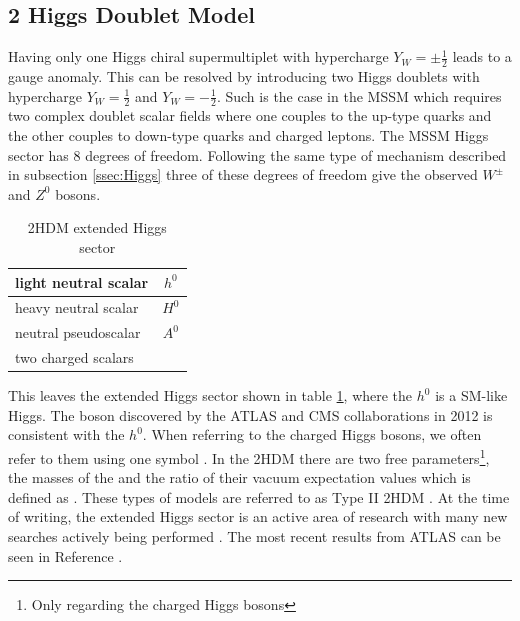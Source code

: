 	\subsection{2 Higgs Doublet Model}\label{ssec:2HDM}
		Having only one Higgs chiral supermultiplet with hypercharge $Y_W=\pm \frac{1}{2}$ leads to a gauge anomaly. This can be resolved by introducing two Higgs doublets with hypercharge $Y_W=\frac{1}{2}$ and $Y_W=-\frac{1}{2}$. Such is the case in the \gls{MSSM} which requires two complex doublet scalar fields where one couples to the up-type quarks and the other couples to down-type quarks and charged leptons. The \gls{MSSM} Higgs sector has 8 degrees of freedom. Following the same type of mechanism described in subsection \ref{ssec:Higgs} three of these degrees of freedom give the observed $W^\pm$ and $Z^0$ bosons. 
		\begin{table}[!thp]
				\centering
				\caption{\gls{2HDM} extended Higgs sector \cite{2HDM}}
				\begin{tabular}{| l | c |}
				\hline
				light neutral scalar 	& $h^0$ \\ \hline
				heavy neutral scalar 	& $H^0$ \\ \hline
				neutral pseudoscalar 	& $A^0$ \\ \hline
				two charged scalars 	& \Hpm \\ \hline
 				\end{tabular}
				\label{tab:2HDM}
		\end{table}
		This leaves the extended Higgs sector shown in table \ref{tab:2HDM}, where the $h^0$ is a SM-like Higgs. The boson discovered by the \gls{ATLAS} and \gls{CMS} collaborations in 2012 is consistent with the $h^{0}$. When referring to the charged Higgs bosons, we often refer to them using one symbol \Hpm. In the \gls{2HDM} there are two free parameters\footnote{Only regarding the charged Higgs bosons}, the masses of the \Hpm and the ratio of their vacuum expectation values which is defined as \tanb. These types of models are referred to as Type II \gls{2HDM} \cite{2HDM}. At the time of writing, the extended Higgs sector is an active area of research with many new searches actively being performed \cite{pdg}. The most recent results from ATLAS can be seen in Reference \cite{ATLAS-HBSM-Summary}.



